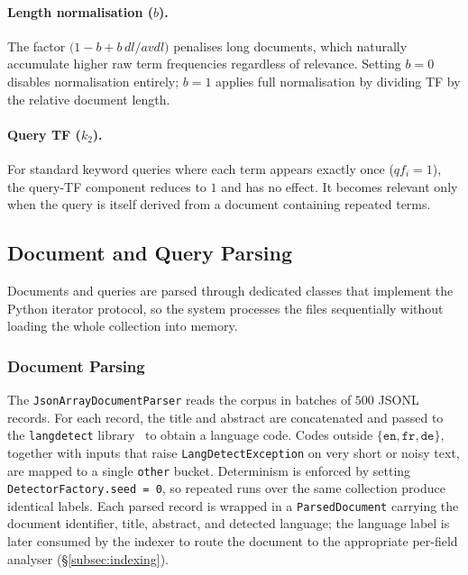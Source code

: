 \paragraph{Length normalisation ($b$).}
The factor $\bigl(1-b+b\,dl/avdl\bigr)$ penalises long documents,
which naturally accumulate higher raw term frequencies regardless of
relevance.  Setting $b=0$ disables normalisation entirely; $b=1$
applies full normalisation by dividing TF by the relative document
length.

\paragraph{Query TF ($k_2$).}
For standard keyword queries where each term appears exactly once
($qf_i=1$), the query-TF component reduces to $1$ and has no effect.
It becomes relevant only when the query is itself derived from a
document containing repeated terms.

\subsection{Document and Query Parsing}
\label{subsec:parsing}

Documents and queries are parsed through dedicated classes that
implement the Python iterator protocol, so the system processes the
files sequentially without loading the whole collection into memory.

\subsubsection{Document Parsing}
The \texttt{JsonArrayDocumentParser} reads the corpus in batches of
$500$ JSONL records.  For each record, the title and abstract are
concatenated and passed to the \texttt{langdetect}
library~\citep{Shuyo2010} to obtain a language code.  Codes outside
$\{\texttt{en},\texttt{fr},\texttt{de}\}$, together with inputs that
raise \texttt{LangDetectException} on very short or noisy text, are
mapped to a single \texttt{other} bucket.  Determinism is enforced by
setting \texttt{DetectorFactory.seed = 0}, so repeated runs over the
same collection produce identical labels.  Each parsed record is
wrapped in a \texttt{ParsedDocument} carrying the document identifier,
title, abstract, and detected language; the language label is later
consumed by the indexer to route the document to the appropriate
per-field analyser (\S\ref{subsec:indexing}).

